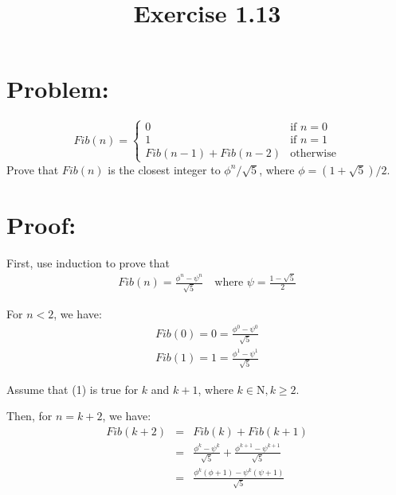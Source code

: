 \documentclass{article}
\begin{document}
\title{Exercise 1.13}
\maketitle

\section*{Problem:}

    \[
        Fib(n) = \left\{ 
                 \begin {array}{ll}
                 0 & \textrm{if $n = 0$} \\
                 1 & \textrm{if $n = 1$} \\
                 Fib(n - 1) + Fib(n - 2) & \textrm{otherwise}
                 \end{array}
                 \right.
    \]
    Prove that $Fib(n)$ is the closest integer to $\phi^{n} / \sqrt{5}$, where 
    $\phi = (1 + \sqrt{5}) / 2$.

\section*{Proof:}


    First, use induction to prove that 
    \begin{eqnarray}
        Fib(n) = \frac{\phi^{n} - \psi^{n}}{\sqrt{5}} \quad
        \textrm{where $\psi = \frac{1 - \sqrt{5}}{2}$}
    \end{eqnarray}


    \noindent
    For $n < 2$, we have:
    \begin{eqnarray}
        Fib(0) = 0 = \frac{\phi^{0} - \psi^{0}}{\sqrt{5}}\\
        Fib(1) = 1 = \frac{\phi^{1} - \psi^{1}}{\sqrt{5}}
    \end{eqnarray}


    \noindent
    Assume that (1) is true for $k$ and $k + 1$, where $k \in \mathrm{N}, k \geq 2$. 


    \noindent
    Then, for $n = k + 2$, we have:
    \begin{eqnarray}
        Fib(k + 2) &=& Fib(k) + Fib(k + 1) \nonumber \\
                   &=& \frac{\phi^{k} - \psi^{k}}{\sqrt{5}} + 
                       \frac{\phi^{k + 1} - \psi^{k + 1}}{\sqrt{5}} \nonumber \\
                   &=& \frac{\phi^{k}(\phi + 1) - \psi^{k}(\psi + 1)}{\sqrt{5}}
    \end{eqnarray}
\end{document}
